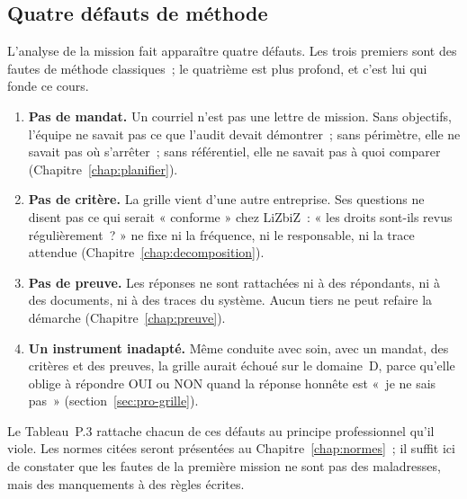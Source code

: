 \subsection{Quatre défauts de méthode}

L'analyse de la mission fait apparaître quatre défauts. Les trois premiers
sont des fautes de méthode classiques~; le quatrième est plus profond, et
c'est lui qui fonde ce cours.

\begin{enumerate}
    \item \textbf{Pas de mandat.} Un courriel n'est pas une lettre de
          mission. Sans objectifs, l'équipe ne savait pas ce que l'audit
          devait démontrer~; sans périmètre, elle ne savait pas où
          s'arrêter~; sans référentiel, elle ne savait pas à quoi comparer
          (Chapitre~\ref{chap:planifier}).
    \item \textbf{Pas de critère.} La grille vient d'une autre entreprise.
          Ses questions ne disent pas ce qui serait « conforme » chez
          LiZbiZ~: « les droits sont-ils revus régulièrement~? » ne fixe ni la
          fréquence, ni le responsable, ni la trace attendue
          (Chapitre~\ref{chap:decomposition}).
    \item \textbf{Pas de preuve.} Les réponses ne sont rattachées ni à des
          répondants, ni à des documents, ni à des traces du système. Aucun
          tiers ne peut refaire la démarche (Chapitre~\ref{chap:preuve}).
    \item \textbf{Un instrument inadapté.} Même conduite avec soin, avec un
          mandat, des critères et des preuves, la grille aurait échoué sur le
          domaine~D, parce qu'elle oblige à répondre OUI ou NON quand la
          réponse honnête est «~je ne sais pas~»
          (section~\ref{sec:pro-grille}).
\end{enumerate}

Le Tableau~P.3 rattache chacun de ces défauts au principe professionnel
qu'il viole. Les normes citées seront présentées au
Chapitre~\ref{chap:normes}~; il suffit ici de constater que les fautes de la
première mission ne sont pas des maladresses, mais des manquements à des
règles écrites.

